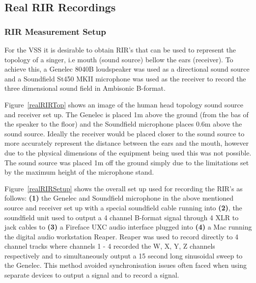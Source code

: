 \documentclass[../../main.tex]{subfiles}
\begin{document}
\subsection{Real RIR Recordings}
\label{realRIRs}
	
	\subsubsection{RIR Measurement Setup}

		For the \ac{VSS} it is desirable to obtain \ac{RIR}'s that can be used to represent the topology of a singer, i.e mouth (sound source) bellow the ears (receiver). To achieve this, a Genelec 8040B \cite{genelec} loudspeaker was used as a directional sound source and a Soundfield St450 MKII microphone \cite{st450} was used as the receiver to record the three dimensional sound field in Ambisonic B-format. 

		Figure~\ref{realRIRTop} shows an image of the human head topology sound source and receiver set up. The Genelec is placed 1m above the ground (from the bas of the speaker to the floor) and the Soundfield microphone places 0.6m above the sound source. Ideally the receiver would be placed closer to the sound source to more accurately represent the distance between the ears and the mouth, however due to the physical dimensions of the equipment being used this was not possible. The sound source was placed 1m off the ground simply due to the limitations set by the maximum height of the microphone stand.

		Figure~\ref{realRIRSetup} shows the overall set up used for recording the \ac{RIR}'s as follows: \textbf{(1)} the Genelec and Soundfield microphone in the above mentioned source and receiver set up with a special soundfield cable running into \textbf{(2)}, the soundfield unit used to output a 4 channel B-format signal through 4 XLR to jack cables to \textbf{(3)} a Fireface UXC audio interface plugged into \textbf{(4)} a Mac running the digital audio workstation Reaper. Reaper was used to record directly to 4 channel tracks where channels 1 - 4 recorded the W, X, Y, Z channels respectively and to simultaneously output a 15 second long sinusoidal sweep to the Genelec. This method avoided synchronisation issues often faced when using separate devices to output a signal and to record a signal.
\end{document}
